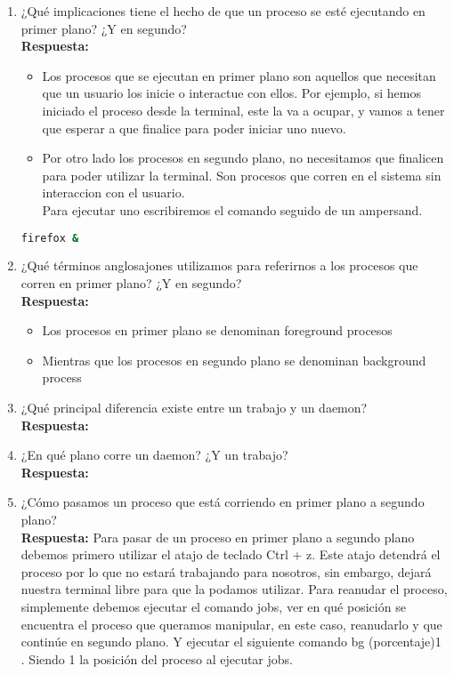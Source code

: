 \documentclass[a4paper,12pt]{article}
\begin{document}
\begin{enumerate}[label=\textbf{Pregunta \arabic*.}]
    \newpage

    \item ¿Qué implicaciones tiene el hecho de que un proceso se esté ejecutando en primer plano? ¿Y en segundo? \\
    \textbf{Respuesta:} 
    \begin{itemize}
        \item Los procesos que se ejecutan en primer plano son aquellos que necesitan que un usuario los inicie o interactue con ellos. Por ejemplo, si hemos iniciado el proceso desde la terminal, este la va a ocupar, y vamos a tener que esperar a que finalice para poder iniciar uno nuevo.
        \item Por otro lado los procesos en segundo plano, no necesitamos que finalicen para poder utilizar la terminal. Son procesos que corren en el sistema sin interaccion con el usuario. \\
        Para ejecutar uno escribiremos el comando seguido de un ampersand.
    \end{itemize}
    
    \begin{lstlisting}[language=bash]
        firefox &
\end{lstlisting}


    \item ¿Qué términos anglosajones utilizamos para referirnos a los procesos que corren en primer plano? ¿Y en segundo? \\
    \textbf{Respuesta:} 
    \begin{itemize}
        \item Los procesos en primer plano se denominan foreground procesos
        \item Mientras que los procesos en segundo plano se denominan background process
    \end{itemize}

    \item ¿Qué principal diferencia existe entre un trabajo y un daemon? \\ %
    \textbf{Respuesta:} 
    

    \item ¿En qué plano corre un daemon? ¿Y un trabajo? \\ %
    \textbf{Respuesta:} 
    

    \item ¿Cómo pasamos un proceso que está corriendo en primer plano a segundo plano? \\ %
    \textbf{Respuesta:} 
    Para pasar de un proceso en primer plano a segundo plano debemos primero utilizar el atajo de teclado Ctrl + z. Este atajo detendrá el proceso por lo que no estará trabajando para nosotros, sin embargo, dejará nuestra terminal libre para que la podamos utilizar. Para reanudar el proceso, simplemente debemos ejecutar el comando jobs, ver en qué posición se encuentra el proceso que queramos manipular, en este caso, reanudarlo y que continúe en segundo plano. Y ejecutar el siguiente comando bg (porcentaje)1 . Siendo 1 la posición del proceso al ejecutar jobs.



\end{enumerate}
\end{document}

